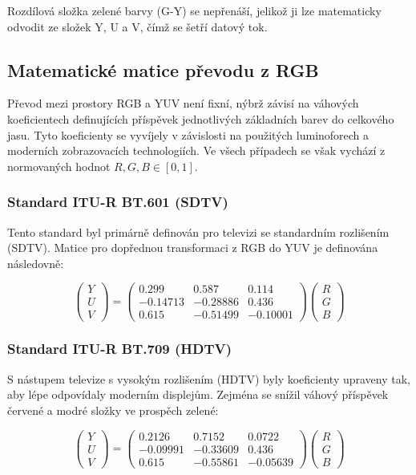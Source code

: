 Rozdílová složka zelené barvy (G-Y) se nepřenáší, jelikož ji lze matematicky odvodit ze složek Y, U a V, čímž se šetří datový tok.

\subsection{Matematické matice převodu z RGB}

Převod mezi prostory RGB a YUV není fixní, nýbrž závisí na váhových koeficientech definujících příspěvek jednotlivých základních barev do celkového jasu. Tyto koeficienty se vyvíjely v závislosti na použitých luminoforech a moderních zobrazovacích technologiích. Ve všech případech se však vychází z normovaných hodnot $R, G, B \in [0, 1]$.

\subsubsection{Standard ITU-R BT.601 (SDTV)}
Tento standard byl primárně definován pro televizi se standardním rozlišením (SDTV). Matice pro dopřednou transformaci z RGB do YUV je definována následovně:

\begin{equation}
\begin{pmatrix}
Y \\
U \\
V
\end{pmatrix}
=
\begin{pmatrix}
0.299 & 0.587 & 0.114 \\
-0.14713 & -0.28886 & 0.436 \\
0.615 & -0.51499 & -0.10001
\end{pmatrix}
\begin{pmatrix}
R \\
G \\
B
\end{pmatrix}
\label{eq:bt601}
\end{equation}

\subsubsection{Standard ITU-R BT.709 (HDTV)}
S nástupem televize s vysokým rozlišením (HDTV) byly koeficienty upraveny tak, aby lépe odpovídaly moderním displejům. Zejména se snížil váhový příspěvek červené a modré složky ve prospěch zelené:

\begin{equation}
\begin{pmatrix}
Y \\
U \\
V
\end{pmatrix}
=
\begin{pmatrix}
0.2126 & 0.7152 & 0.0722 \\
-0.09991 & -0.33609 & 0.436 \\
0.615 & -0.55861 & -0.05639
\end{pmatrix}
\begin{pmatrix}
R \\
G \\
B
\end{pmatrix}
\label{eq:bt709}
\end{equation}

